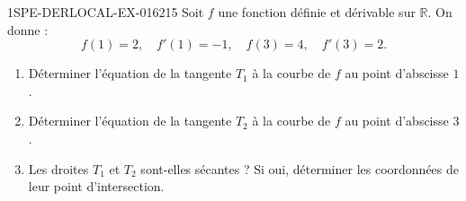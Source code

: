 \begin{exercice}{1SPE-DERLOCAL-EX-016}{2}{15}
Soit $f$ une fonction définie et dérivable sur $\mathbb{R}$. On donne :
\[
f(1) = 2, \quad f'(1) = -1, \quad f(3) = 4, \quad f'(3) = 2.
\]

\begin{enumerate}
  \item Déterminer l'équation de la tangente $T_1$ à la courbe de $f$ au point d'abscisse $1$.
  \item Déterminer l'équation de la tangente $T_2$ à la courbe de $f$ au point d'abscisse $3$.
  \item Les droites $T_1$ et $T_2$ sont-elles sécantes ? Si oui, déterminer les coordonnées de leur point d'intersection.
\end{enumerate}
\end{exercice}
